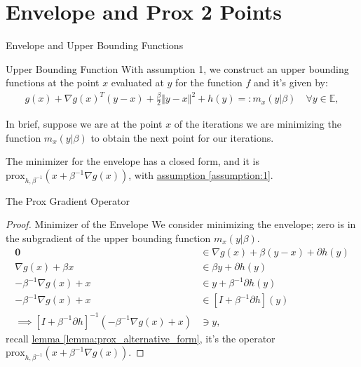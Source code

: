 \documentclass[11pt]{beamer}
\begin{document}
\section{Envelope and Prox 2 Points}
    \begin{frame}{Envelope and Upper Bounding Functions}
        \begin{block}{Upper Bounding Function}
            With assumption 1, we construct an upper bounding functions at the point $x$ evaluated at $y$ for the function $f$ and it's given by: 
            \begin{align*}
                g(x) + \nabla g(x)^T(y - x) + \frac{\beta}{2} \Vert y - x\Vert^2
                + h(y) =: m_x(y|\beta) \quad \forall y \in \mathbb E, 
            \end{align*}    
        \end{block}
        In brief, suppose we are at the point $x$ of the iterations we are minimizing the function $m_x(y|\beta)$ to obtain the next point for our iterations.
        \begin{theorem}\label{thm:minimizer_envelope}
            The minimizer for the envelope has a closed form, and it is $\text{prox}_{h, \beta^{-1}}(x + \beta^{-1}\nabla g(x))$, with \hyperref[assumption:1]{assumption \ref*{assumption:1}}. 
        \end{theorem}
    \end{frame}
    \begin{frame}{The Prox Gradient Operator}
        \begin{proof}{Minimizer of the Envelope}
            We consider minimizing the envelope; zero is in the subgradient of the upper bounding function $m_x(y|\beta)$. 
            \begin{align*}
                \mathbf 0 &\in 
                \nabla g(x) + {\beta}(y - x) + \partial h(y)
                \\
                \nabla g(x) + \beta x & \in
                \beta y + \partial h(y)
                \\
                -\beta^{-1} \nabla g(x) + x &\in y + \beta^{-1} \partial h(y)
                \\
                -\beta^{-1} \nabla g(x) + x &\in [I + \beta^{-1} \partial h](y)
                \\
                \implies
                [I + \beta^{-1}\partial h]^{-1}(- \beta^{-1} \nabla g(x) + x) 
                & \ni y,
            \end{align*}
            recall \hyperref[lemma:prox_alternative_form]{lemma \ref*{lemma:prox_alternative_form}}, it's the operator $\text{prox}_{h, \beta^{-1}}(x + \beta^{-1}\nabla g(x))$. 
        \end{proof}
    \end{frame}
\end{document}
